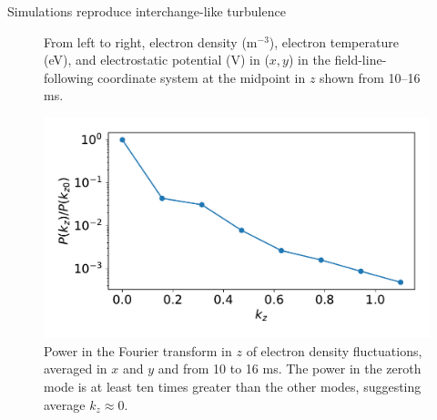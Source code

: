 \documentclass[12pt,table]{beamer}
\begin{document}
\begin{frame}{Simulations reproduce interchange-like turbulence}
\begin{figure}
    \centering
    \caption{From left to right, electron density (m$^{-3}$), electron temperature (eV), and electrostatic potential (V) in ($x,y$) in the field-line-following coordinate system at the midpoint in $z$ shown from 10--16 ms.}
\end{figure}%
\begin{figure}
    \begin{minipage}{0.6\linewidth}
    \centering
    \includegraphics[width=.9\linewidth]{figs/kz-line.pdf}
    \end{minipage}%
    \begin{minipage}{0.4\linewidth}
    \caption{Power in the Fourier transform in $z$ of electron density fluctuations, averaged in $x$ and $y$ and from 10 to 16 ms. The power in the zeroth mode is at least ten times greater than the other modes, suggesting average $k_z \approx 0$.}
    \label{fig:my_label}
    \end{minipage}
\end{figure}
\end{frame}
\end{document}
